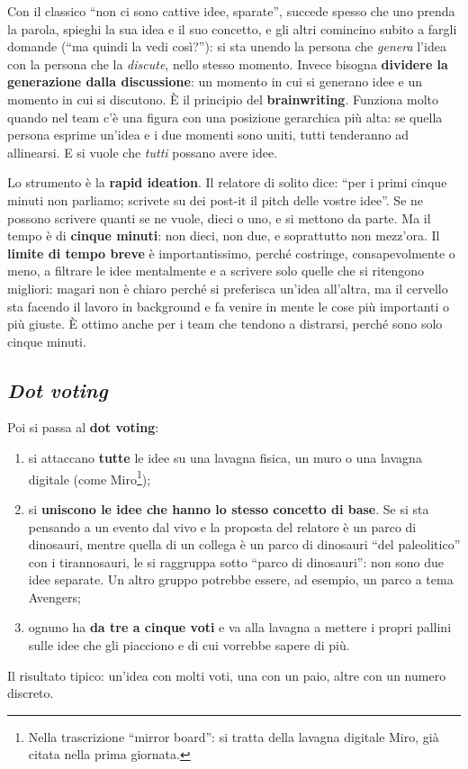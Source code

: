 Con il classico ``non ci sono cattive idee, sparate'', succede spesso che uno prenda
la parola, spieghi la sua idea e il suo concetto, e gli altri comincino subito a
fargli domande (``ma quindi la vedi così?''): si sta unendo la persona che
\emph{genera} l'idea con la persona che la \emph{discute}, nello stesso momento.
Invece bisogna \textbf{dividere la generazione dalla discussione}: un momento in cui
si generano idee e un momento in cui si discutono. È il principio del
\textbf{brainwriting}. Funziona molto quando nel team c'è una figura con una
posizione gerarchica più alta: se quella persona esprime un'idea e i due momenti
sono uniti, tutti tenderanno ad allinearsi. E si vuole che \emph{tutti} possano
avere idee.

Lo strumento è la \textbf{rapid ideation}. Il relatore di solito dice: ``per i primi
cinque minuti non parliamo; scrivete su dei post-it il pitch delle vostre idee''. Se
ne possono scrivere quanti se ne vuole, dieci o uno, e si mettono da parte. Ma il
tempo è di \textbf{cinque minuti}: non dieci, non due, e soprattutto non mezz'ora.
Il \textbf{limite di tempo breve} è importantissimo, perché costringe,
consapevolmente o meno, a filtrare le idee mentalmente e a scrivere solo quelle che
si ritengono migliori: magari non è chiaro perché si preferisca un'idea all'altra,
ma il cervello sta facendo il lavoro in background e fa venire in mente le cose più
importanti o più giuste. È ottimo anche per i team che tendono a distrarsi, perché
sono solo cinque minuti.

\subsection{\emph{Dot voting}}

Poi si passa al \textbf{dot voting}:
\begin{enumerate}
  \item si attaccano \textbf{tutte} le idee su una lavagna fisica, un muro o una
        lavagna digitale (come Miro\footnote{Nella trascrizione ``mirror board'':
        si tratta della lavagna digitale Miro, già citata nella prima
        giornata.});
  \item si \textbf{uniscono le idee che hanno lo stesso concetto di base}. Se si sta
        pensando a un evento dal vivo e la proposta del relatore è un parco di
        dinosauri, mentre quella di un collega è un parco di dinosauri ``del
        paleolitico'' con i tirannosauri, le si raggruppa sotto ``parco di
        dinosauri'': non sono due idee separate. Un altro gruppo potrebbe essere,
        ad esempio, un parco a tema Avengers;
  \item ognuno ha \textbf{da tre a cinque voti} e va alla lavagna a mettere i propri
        pallini sulle idee che gli piacciono e di cui vorrebbe sapere di più.
\end{enumerate}
Il risultato tipico: un'idea con molti voti, una con un paio, altre con un numero
discreto.

